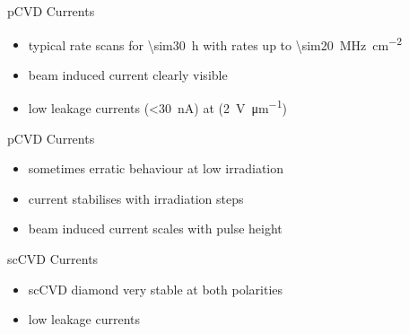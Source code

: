 \begin{frame}{pCVD Currents}
 
	
	\begin{itemize} \itemfill
		\item typical rate scans for \SI{\sim30}{\hour} with rates up to \SI{\sim20}{\mega\hertz\per\centi\meter^2}
		\item beam induced current clearly visible
		\item low leakage currents (\SI{<30}{\nano\ampere}) at (\SI{2}{\volt\per\micro m})
	\end{itemize}
 
\end{frame}
\begin{frame}{pCVD Currents}
 
	
	\begin{itemize} \itemfill
		\item sometimes erratic behaviour at low irradiation
		\item current stabilises with irradiation steps
		\item beam induced current scales with pulse height
	\end{itemize}
 
\end{frame}
\begin{frame}{scCVD Currents}
 
	\vspace*{-10pt}
	
	\begin{itemize} \itemfill
		\item scCVD diamond very stable at both polarities
		\item low leakage currents 
	\end{itemize}
 
\end{frame}
